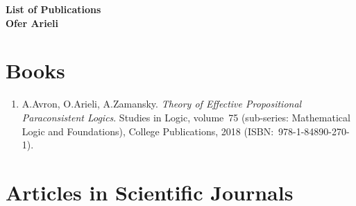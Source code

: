 \documentclass{article}
\begin{document}
\begin{center}
{\Large\bf List of Publications \vspace{4mm} \\ Ofer Arieli \vspace{4mm} \\ }
\end{center}


\section*{Books}

\begin{enumerate}

   \item A.Avron, O.Arieli, A.Zamansky. {\em Theory of Effective Propositional Paraconsistent Logics\/}.
          Studies in Logic, volume~75 (sub-series: Mathematical Logic and Foundations), College Publications, 2018
         (ISBN:~978-1-84890-270-1).

\end{enumerate}


\section*{Articles in Scientific Journals}
\end{document}
